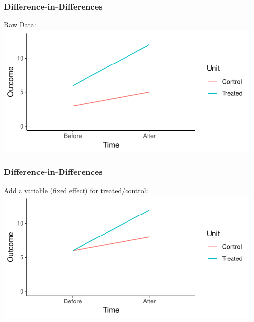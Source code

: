 \documentclass[xcolor=x11names,compress]{beamer}\usepackage[]{graphicx}\usepackage[]{color}
\makeatletter
\def\maxwidth{ %
  \ifdim\Gin@nat@width>\linewidth
    \linewidth
  \else
    \Gin@nat@width
  \fi
}
\newenvironment{knitrout}{}{} %
\renewcommand{\(}{\begin{columns}}
\renewcommand{\)}{\end{columns}}
\newcommand{\<}[1]{\begin{column}{#1}}
\renewcommand{\>}{\end{column}}
\makeatother
\begin{document}
\begin{frame}
\frametitle{Difference-in-Differences}
Raw Data:
\begin{knitrout}
\color{fgcolor}
\includegraphics[width=\maxwidth]{figure/DinD_chart2-1} 

\end{knitrout}
\end{frame}

\begin{frame}
\frametitle{Difference-in-Differences}
Add a variable (fixed effect) for treated/control:
\begin{knitrout}
\color{fgcolor}
\includegraphics[width=\maxwidth]{figure/DinD_chart3-1} 

\end{knitrout}
\end{frame}
\end{document}
